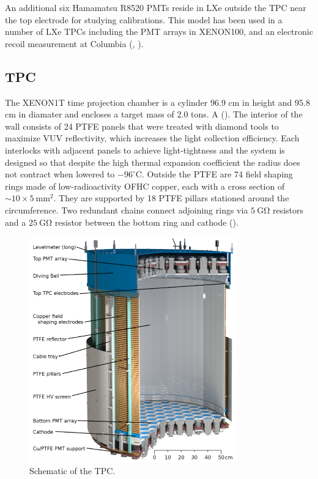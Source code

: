 An additional six Hamamatsu R8520 PMTs reside in LXe outside the TPC near the top electrode for studying calibrations.  This model has
been used in a number of LXe TPCs including the PMT arrays in XENON100, and an electronic recoil measurement at
Columbia (, ).




\subsection{TPC}
\label{subsec:xenon1t_tpc}
The XENON1T time projection chamber is a cylinder 96.9 cm in height and 95.8 cm in diamater and encloses a target mass of 2.0 tons.  A
().  The interior of the wall consists of 24 PTFE panels that were treated with diamond tools to
maximize VUV reflectivity, which increases the light collection efficiency.  Each interlocks with adjacent panels to achieve
light-tightness and the system is designed so that despite
the high thermal expansion coefficient the radius does not contract when lowered to $-96^{\circ}\mathrm{C}$.  Outside the PTFE are 74
field shaping rings made of low-radioactivity OFHC copper, each with a cross section of ${\sim} 10 \times 5\ \mathrm{mm^{2}}$.  They are
supported by 18 PTFE pillars stationed around the circumference.  Two redundant
chains connect adjoining rings via $5\ \mathrm{G \Omega}$ resistors and a $25\ \mathrm{G \Omega}$ resistor between the bottom ring and
cathode ().

\begin{figure}
\centering
\includegraphics[width=0.8\textwidth]{XENON1TTPC}
\caption{Schematic of the TPC.}
\label{fig:xenon1t_tpc_tpc}
\end{figure}


